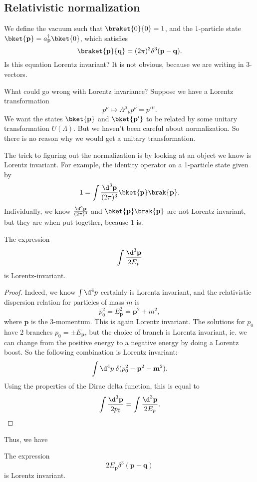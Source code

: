 \documentclass[a4paper]{article}
\begin{document}
\subsection{Relativistic normalization}
We define the vacuum such that $\braket{0}{0} = 1$, and the $1$-particle state $\bket{\mathbf{p}} = a_\mathbf{p}^\dagger \bket{0}$, which satisfies
\[
  \braket{\mathbf{p}}{\mathbf{q}} = (2\pi)^3 \delta^3(\mathbf{p} - \mathbf{q}).
\]
Is this equation Lorentz invariant? It is not obvious, because we are writing in $3$-vectors.

What could go wrong with Lorentz invariance? Suppose we have a Lorentz transformation
\[
  p^\nu \mapsto \Lambda^\mu\!_\nu p^\nu = p'^\mu.
\]
We want the states $\bket{\mathbf{p}}$ and $\bket{\mathbf{p}'}$ to be related by some unitary transformation $U(\Lambda)$. But we haven't been careful about normalization. So there is no reason why we would get a unitary transformation.

The trick to figuring out the normalization is by looking at an object we know is Lorentz invariant. For example, the identity operator on a 1-particle state given by
\[
  1 = \int \frac{\d^3 \mathbf{p}}{(2\pi)^3} \bket{\mathbf{p}} \brak{\mathbf{p}}.
\]
Individually, we know $\frac{\d^3 \mathbf{p}}{(2\pi)^3}$ and $\bket{\mathbf{p}}\brak{\mathbf{p}}$ are not Lorentz invariant, but they are when put together, because $1$ is.

\begin{prop}
  The expression
  \[
    \int \frac{\d^3 \mathbf{p}}{2 E_p}
  \]
  is Lorentz-invariant.
\end{prop}

\begin{proof}
  Indeed, we know $\int \d^4 p$ certainly is Lorentz invariant, and the relativistic dispersion relation for particles of mass $m$ is
  \[
    p_0^2 = E_\mathbf{p}^2 = \mathbf{p}^2 + m^2,
  \]
  where $\mathbf{p}$ is the $3$-momentum. This is again Lorentz invariant. The solutions for $p_0$ have $2$ branches $p_0 = \pm E_\mathbf{p}$, but the choice of branch is Lorentz invariant, ie. we can change from the positive energy to a negative energy by doing a Lorentz boost. So the following combination is Lorentz invariant:
  \[
    \int \d^4 p\; \delta(p_0^2 - \mathbf{p}^2 - \mathbf{m}^2).
  \]
  Using the properties of the Dirac delta function, this is equal to
  \[
    \int \frac{\d^3 \mathbf{p}}{2 p_0} = \int \frac{\d^3 \mathbf{p}}{2 E_p}.
  \]
\end{proof}

Thus, we have
\begin{prop}
  The expression
  \[
    2E_\mathbf{p} \delta^3 (\mathbf{p} - \mathbf{q})
  \]
  is Lorentz invariant.
\end{prop}
\end{document}
